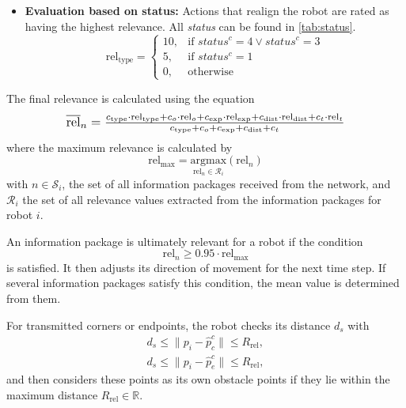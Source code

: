 \documentclass[conference]{IEEEtran}
\begin{document}
\begin{itemize}
    \item \textbf{Evaluation based on status:}
    Actions that realign the robot are rated as having the highest relevance. All \textit{status} can be found in \ref{tab:status}.
    \begin{equation}
        \mathrm{rel}_{\mathrm{type}} =
        \begin{cases}
        10, & \text{if } status^c = 4 \vee status^c = 3 \\
        5,  & \text{if } status^c = 1 \\
        0,  & \text{otherwise}
        \end{cases}
        \label{eq:10}
    \end{equation}
\end{itemize}

The final relevance is calculated using the equation
\begin{equation}
    \scalebox{1.15}{$\overline{\mathrm{rel}}_n = \frac{c_{\mathrm{type}} \cdot \mathrm{rel}_{\mathrm{type}} + c_o \cdot \mathrm{rel}_o + c_{\mathrm{exp}} \cdot \mathrm{rel}_{\mathrm{exp}} + c_{\mathrm{dist}} \cdot \mathrm{rel}_{\mathrm{dist}} + c_t \cdot \mathrm{rel}_t}{c_{\mathrm{type}} + c_o + c_{\mathrm{exp}} + c_{\mathrm{dist}} + c_t}$}
    \label{eq:11}
\end{equation}
where the maximum relevance is calculated by 
\begin{equation}
    \mathrm{rel}_{\mathrm{max}} = \underset{\mathrm{rel}_n \in \mathcal{R}_i}{\mathrm{argmax}}(\mathrm{rel}_n)
    \label{eq:12}
\end{equation}
with $n \in \mathcal{S}_i$, the set of all information packages received from the network, and 
$\mathcal{R}_i$ the set of all relevance values extracted from the information packages for robot $i$.

An information package is ultimately relevant for a robot if the condition
\begin{equation}
    \mathrm{rel}_n \geq 0.95 \cdot \mathrm{rel}_{\mathrm{max}}
    \label{eq:13}
\end{equation}
is satisfied. It then adjusts its 
direction of movement for the next time step. If several information packages 
satisfy this condition, the mean value is determined from them.

For transmitted corners or endpoints, the robot checks its distance $d_s$ with
\begin{equation}
    \begin{split}
    d_s \leq \| p_i - \hat{p}_c^c \| \leq R_{\mathrm{rel}},\\
    d_s \leq \| p_i - \hat{p}_e^c \| \leq R_{\mathrm{rel}},
    \end{split}
    \label{eq:14}
\end{equation}
and then considers these points as its own obstacle points if 
they lie within the maximum distance \( R_{\mathrm{rel}} \in \mathbb{R} \).
\end{document}
